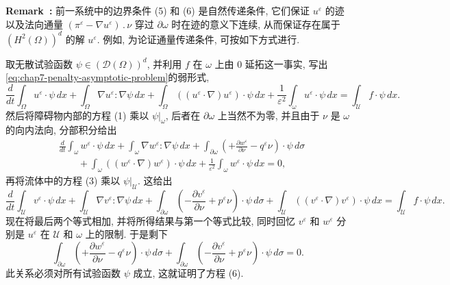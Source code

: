 \begin{sloppypar}
\par\noindent{}\textbf{Remark~\thechaptersevensectiontworemark:}\label{rem:chap7-natural-transmission-conditions}
前一系统中的边界条件 (5) 和 (6) 是自然传递条件, 它们保证 $u^\varepsilon$ 的迹以及法向通量 $(\pi^\varepsilon-\nabla u^\varepsilon)\mathbin{.}\nu$ 穿过 $\partial\omega$ 时在迹的意义下连续, 从而保证存在属于 $(H^2(\Omega))^d$ 的解 $u^\varepsilon$. 例如, 为论证通量传递条件, 可按如下方式进行.

取无散试验函数 $\psi\in(\mathcal D(\Omega))^d$, 并利用 $f$ 在 $\omega$ 上由 $0$ 延拓这一事实, 写出\eqref{eq:chap7-penalty-asymptotic-problem}的弱形式,
\[
 \frac d{dt}\int_\Omega u^\varepsilon\cdot\psi\,dx
 +\int_\Omega\nabla u^\varepsilon:\nabla\psi\,dx
 +\int_\Omega((u^\varepsilon\cdot\nabla)u^\varepsilon)\cdot\psi\,dx
 +\frac1{\varepsilon^2}\int_\omega u^\varepsilon\cdot\psi\,dx
 =\int_\mathcal U f\cdot\psi\,dx.
\]
然后将障碍物内部的方程 (1) 乘以 $\psi|_\omega$, 后者在 $\partial\omega$ 上当然不为零, 并且由于 $\nu$ 是 $\omega$ 的向内法向, 分部积分给出
\[
\begin{aligned}
 &\frac d{dt}\int_\omega w^\varepsilon\cdot\psi\,dx
 +\int_\omega\nabla w^\varepsilon:\nabla\psi\,dx
 +\int_{\partial\omega}\left(+\frac{\partial w^\varepsilon}{\partial\nu}-q^\varepsilon\nu\right)\cdot\psi\,d\sigma\\
 &\qquad+\int_\omega((w^\varepsilon\cdot\nabla)w^\varepsilon)\cdot\psi\,dx
 +\frac1{\varepsilon^2}\int_\omega w^\varepsilon\cdot\psi\,dx=0,
\end{aligned}
\]
再将流体中的方程 (3) 乘以 $\psi|_\mathcal U$. 这给出
\[
 \frac d{dt}\int_\mathcal U v^\varepsilon\cdot\psi\,dx
 +\int_\mathcal U\nabla v^\varepsilon:\nabla\psi\,dx
 +\int_{\partial\omega}\left(-\frac{\partial v^\varepsilon}{\partial\nu}+p^\varepsilon\nu\right)\cdot\psi\,d\sigma
 +\int_\mathcal U((v^\varepsilon\cdot\nabla)v^\varepsilon)\cdot\psi\,dx
 =\int_\mathcal U f\cdot\psi\,dx.
\]
现在将最后两个等式相加, 并将所得结果与第一个等式比较, 同时回忆 $v^\varepsilon$ 和 $w^\varepsilon$ 分别是 $u^\varepsilon$ 在 $\mathcal U$ 和 $\omega$ 上的限制. 于是剩下
\[
 \int_{\partial\omega}\left(+\frac{\partial w^\varepsilon}{\partial\nu}-q^\varepsilon\nu\right)\cdot\psi\,d\sigma
 +\int_{\partial\omega}\left(-\frac{\partial v^\varepsilon}{\partial\nu}+p^\varepsilon\nu\right)\cdot\psi\,d\sigma=0.
\]
此关系必须对所有试验函数 $\psi$ 成立, 这就证明了方程 (6).


\end{sloppypar}
